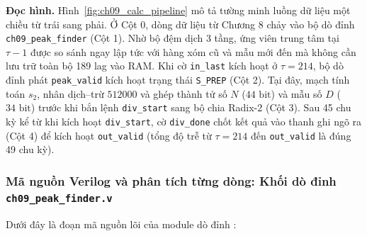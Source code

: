 \textbf{Đọc hình.} Hình~\ref{fig:ch09_calc_pipeline} mô tả tường minh luồng dữ liệu một chiều từ trái sang phải. Ở Cột 0, dòng dữ liệu từ Chương 8 chảy vào bộ dò đỉnh \texttt{ch09\_peak\_finder} (Cột 1). Nhờ bộ đệm dịch 3 tầng, ứng viên trung tâm tại $\tau - 1$ được so sánh ngay lập tức với hàng xóm cũ và mẫu mới đến mà không cần lưu trữ toàn bộ 189 lag vào RAM. Khi cờ \texttt{in\_last} kích hoạt ở $\tau = 214$, bộ dò đỉnh phát \texttt{peak\_valid} kích hoạt trạng thái \texttt{S\_PREP} (Cột 2). Tại đây, mạch tính toán $s_2$, nhân dịch--trừ $512000$ và ghép thành tử số $N$ ($44\text{ bit}$) và mẫu số $D$ ($34\text{ bit}$) trước khi bắn lệnh \texttt{div\_start} sang bộ chia Radix-2 (Cột 3). Sau 45 chu kỳ kể từ khi kích hoạt \texttt{div\_start}, cờ \texttt{div\_done} chốt kết quả vào thanh ghi ngõ ra (Cột 4) để kích hoạt \texttt{out\_valid} (tổng độ trễ từ $\tau = 214$ đến \texttt{out\_valid} là đúng 49 chu kỳ).

\subsubsection*{Mã nguồn Verilog và phân tích từng dòng: Khối dò đỉnh \texttt{ch09\_peak\_finder.v}}
Dưới đây là đoạn mã nguồn lõi của module dò đỉnh :



